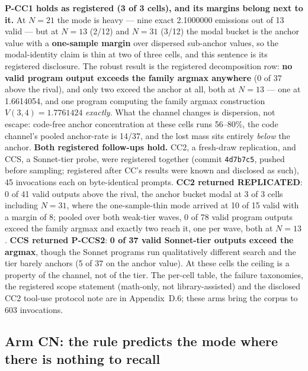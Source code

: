 \textbf{P-CC1 holds as registered (3 of 3 cells), and its margins belong next to it.} At $N = 21$
the mode is heavy --- nine exact 2.1000000 emissions out of 13 valid --- but at $N = 13$ (2/12) and
$N = 31$ (3/12) the modal bucket is the anchor value with a \textbf{one-sample margin} over
dispersed sub-anchor values, so the modal-identity claim is thin at two of three cells, and this
sentence is its registered disclosure. The robust result is the registered decomposition row:
\textbf{no valid program output exceeds the family argmax anywhere} (0 of 37 above the rival), and
only two exceed the anchor at all, both at $N = 13$ --- one at 1.6614054, and one program computing
the family argmax construction $V(3, 4) = 1.7761424$ \emph{exactly}. What the channel changes is
dispersion, not escape: code-free anchor concentration at these cells runs 56--80\%, the code
channel's pooled anchor-rate is 14/37, and the lost mass sits entirely \emph{below} the anchor.
\textbf{Both registered follow-ups hold.} CC2, a fresh-draw replication, and CCS, a Sonnet-tier
probe, were registered together (commit \texttt{4d7b7c5}, pushed before sampling; registered after
CC's results were known and disclosed as such), 45 invocations each on byte-identical prompts.
\textbf{CC2 returned REPLICATED}: 0 of 41 valid outputs above the rival, the anchor bucket modal at
3 of 3 cells including $N = 31$, where the one-sample-thin mode arrived at 10 of 15 valid with a
margin of 8; pooled over both weak-tier waves, 0 of 78 valid program outputs exceed the family
argmax and exactly two reach it, one per wave, both at $N = 13$. \textbf{CCS returned P-CCS2}:
\textbf{0 of 37 valid Sonnet-tier outputs exceed the argmax}, though the Sonnet programs run
qualitatively different search and the tier barely anchors (5 of 37 on the anchor value). At these
cells the ceiling is a property of the channel, not of the tier. The per-cell table, the failure
taxonomies, the registered scope statement (math-only, not library-assisted) and the disclosed CC2
tool-use protocol note are in Appendix~D.6; these arms bring the corpus to 603 invocations.

\subsection{Arm CN: the rule predicts the mode where there is nothing to recall}

